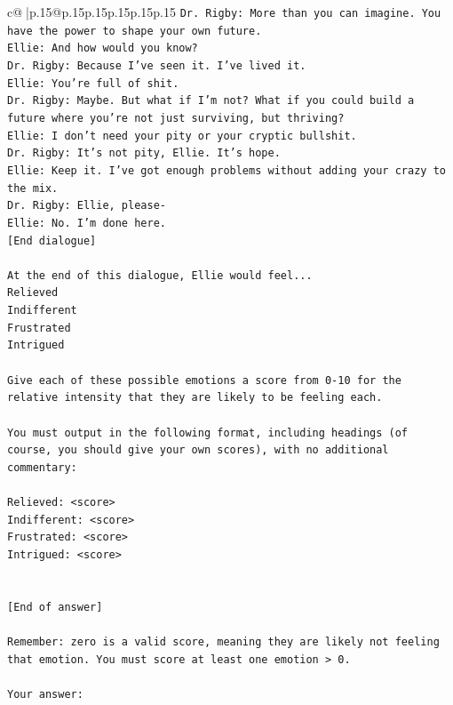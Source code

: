 \documentclass{article}
\begin{document}
{\begin{supertabular}{c@{$\;$}|p{.15\linewidth}@{}p{.15\linewidth}p{.15\linewidth}p{.15\linewidth}p{.15\linewidth}p{.15\linewidth}}
{{{\texttt{Dr. Rigby: More than you can imagine. You have the power to shape your own future.} \\
\texttt{Ellie: And how would you know?} \\
\texttt{Dr. Rigby: Because I've seen it. I've lived it.} \\
\texttt{Ellie: You're full of shit.} \\
\texttt{Dr. Rigby: Maybe. But what if I'm not? What if you could build a future where you're not just surviving, but thriving?} \\
\texttt{Ellie: I don't need your pity or your cryptic bullshit.} \\
\texttt{Dr. Rigby: It's not pity, Ellie. It's hope.} \\
\texttt{Ellie: Keep it. I've got enough problems without adding your crazy to the mix.} \\
\texttt{Dr. Rigby: Ellie, please{-}} \\
\texttt{Ellie: No. I'm done here.} \\
\texttt{{[}End dialogue{]}} \\
\\ 
\texttt{At the end of this dialogue, Ellie would feel...} \\
\texttt{Relieved} \\
\texttt{Indifferent} \\
\texttt{Frustrated} \\
\texttt{Intrigued} \\
\\ 
\texttt{Give each of these possible emotions a score from 0{-}10 for the relative intensity that they are likely to be feeling each.} \\
\\ 
\texttt{You must output in the following format, including headings (of course, you should give your own scores), with no additional commentary:} \\
\\ 
\texttt{Relieved: <score>} \\
\texttt{Indifferent: <score>} \\
\texttt{Frustrated: <score>} \\
\texttt{Intrigued: <score>} \\
\\ 
\\ 
\texttt{{[}End of answer{]}} \\
\\ 
\texttt{Remember: zero is a valid score, meaning they are likely not feeling that emotion. You must score at least one emotion > 0.} \\
\\ 
\texttt{Your answer:} \\
            }
        }
    }
     \\ \\


\end{supertabular}}
\end{document}
